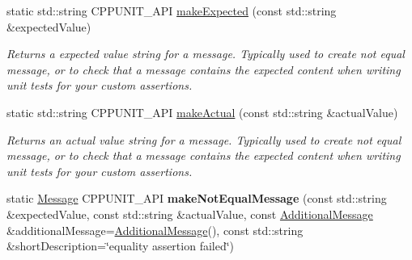 \begin{DoxyCompactItemize}
static std\+::string C\+P\+P\+U\+N\+I\+T\+\_\+\+A\+PI \hyperlink{struct_asserter_adcbee7c01d58bfaee72cc984627e6432}{make\+Expected} (const std\+::string \&expected\+Value)
\begin{DoxyCompactList}\small\item\em Returns a expected value string for a message. Typically used to create \textquotesingle{}not equal\textquotesingle{} message, or to check that a message contains the expected content when writing unit tests for your custom assertions. \end{DoxyCompactList}\item 
static std\+::string C\+P\+P\+U\+N\+I\+T\+\_\+\+A\+PI \hyperlink{struct_asserter_ae52920ca7ffd981df61d7a3cfd88793b}{make\+Actual} (const std\+::string \&actual\+Value)
\begin{DoxyCompactList}\small\item\em Returns an actual value string for a message. Typically used to create \textquotesingle{}not equal\textquotesingle{} message, or to check that a message contains the expected content when writing unit tests for your custom assertions. \end{DoxyCompactList}\item 
static \hyperlink{class_message}{Message} C\+P\+P\+U\+N\+I\+T\+\_\+\+A\+PI {\bfseries make\+Not\+Equal\+Message} (const std\+::string \&expected\+Value, const std\+::string \&actual\+Value, const \hyperlink{class_additional_message}{Additional\+Message} \&additional\+Message=\hyperlink{class_additional_message}{Additional\+Message}(), const std\+::string \&short\+Description=\char`\"{}equality assertion failed\char`\"{})\hypertarget{struct_asserter_adb8ac36c8f0d385430e5a087a66219db}{}\label{struct_asserter_adb8ac36c8f0d385430e5a087a66219db}


\end{DoxyCompactItemize}

